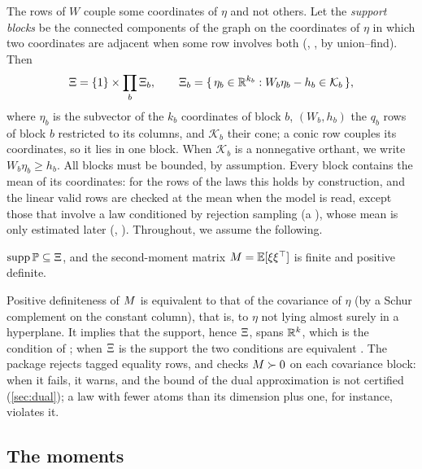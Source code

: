 The rows of $W$ couple some coordinates of $\eta$ and not others.
Let the \emph{support blocks} be the connected components of the graph on the coordinates of $\eta$ in which two coordinates are adjacent when some row involves both (, , by union--find).
Then
\begin{equation}
\label{eq:product-support}
\Xi = \{1\} \times \prod_{b} \Xi_{b},
\qquad
\Xi_{b} = \{\, \eta_b \in \mathbb{R}^{k_b} : W_b \eta_b - h_b \in \mathcal{K}_b \,\},
\end{equation}
where $\eta_b$ is the subvector of the $k_b$ coordinates of block $b$, $(W_b, h_b)$ the $q_b$ rows of block $b$ restricted to its columns,
and $\mathcal{K}_b$ their cone; a conic row couples its coordinates, so it lies in one block.
When $\mathcal{K}_b$ is a nonnegative orthant, we write $W_b\eta_b \ge h_b$.
All blocks must be bounded, by assumption.
Every block contains the mean of its coordinates:
for the rows of the laws this holds by construction, and the linear valid rows are checked at the mean when the model is read,
except those that involve a law conditioned by rejection sampling (a ), whose mean is only estimated later
(, ).
Throughout, we assume the following.

\begin{assumption}
\label{ass:support}
$\operatorname{supp}\mathbb{P} \subseteq \Xi$, and the second-moment matrix $M = \mathbb{E}[\xi\xi^\top]$ is finite and positive definite.
\end{assumption}

Positive definiteness of $M$ is equivalent to that of the covariance of $\eta$ (by a Schur complement on the constant column),
that is, to $\eta$ not lying almost surely in a hyperplane.
It implies that the support, hence $\Xi$, spans $\mathbb{R}^k$, which is the condition of \citet[Section~2]{KWG2011};
when $\Xi$ is the support the two conditions are equivalent \citep[Proposition~2]{KWG2011}.
The package rejects tagged equality rows, and checks $M \succ 0$ on each covariance block:
when it fails, it warns, and the bound of the dual approximation is not certified (\cref{sec:dual});
a law with fewer atoms than its dimension plus one, for instance, violates it.

\subsection{The moments}
\label{sec:moments}

